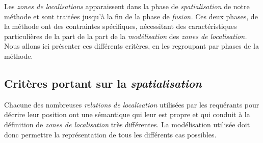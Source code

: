 Les \emph{zones de localisations} apparaissent dans la phase de
\emph{spatialisation} de notre méthode et sont traitées jusqu'à la fin
de la phase de \emph{fusion.} Ces deux phases, de la méthode ont des
contraintes spécifiques, nécessitant des caractéristiques
particulières de la part de la part de la \emph{modélisation} des
\emph{zones de localisation.} Nous allons ici présenter ces différents
critères, en les regroupant par phases de la méthode.

\subsection{Critères portant sur la \emph{spatialisation}}

Chacune des nombreuses \emph{relations de localisation} utilisées par
les requérants pour décrire leur position ont une sémantique qui leur
est propre et qui conduit à la définition de \emph{zones de
  localisation} très différentes. La modélisation utilisée doit donc
permettre la représentation de tous les différents cas possibles.

